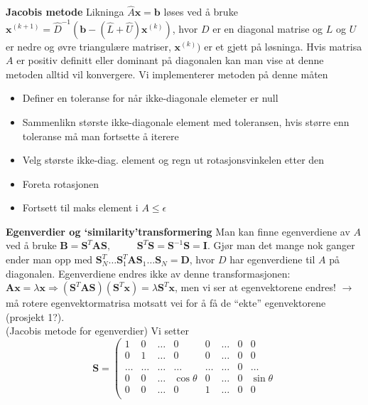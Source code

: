 \documentclass[12pt,a4paper,twocolumn]{article}
\begin{document}
\begin{flushleft}
\textbf{Jacobis metode} Likninga $\hat{A}\mathbf{x}=\mathbf{b}$ løses ved å bruke $\mathbf{x}^{(k+1)}= \hat{D}^{-1}(\mathbf{b}-(\hat{L}+\hat{U})\mathbf{x}^{(k)})$, hvor $D$ er en diagonal matrise og $L$ og $U$ er nedre og øvre triangulære matriser, $\mathbf{x}^{(k)})$ er et gjett på løsninga. Hvis matrisa $A$ er positiv definitt eller dominant på diagonalen kan man vise at denne metoden alltid vil konvergere. Vi implementerer metoden på denne måten
\begin{itemize}
  \item Definer en toleranse for når ikke-diagonale elemeter er null
  \item Sammenlikn største ikke-diagonale element med toleransen, hvis større enn toleranse må man fortsette å iterere
  \item Velg største ikke-diag. element og regn ut rotasjonsvinkelen etter den
  \item Foreta rotasjonen
  \item Fortsett til maks element i $A\leq\epsilon$
\end{itemize}
\textbf{Egenverdier og `similarity'transformering} Man kan finne egenverdiene av $A$ ved å bruke $\mathbf{B}= \mathbf{S}^T \mathbf{A}\mathbf{S},\, \hspace{1cm}  \mathbf{S}^T\mathbf{S}=\mathbf{S}^{-1}\mathbf{S} =\mathbf{I}$. Gjør man det mange nok ganger ender man opp med $\mathbf{S}_N^T\dots \mathbf{S}_1^T\mathbf{A}\mathbf{S}_1\dots \mathbf{S}_N=\mathbf{D}$, hvor $D$ har egenverdiene til $A$ på diagonalen. Egenverdiene endres ikke av denne transformasjonen: $\mathbf{A}\mathbf{x}=\lambda\mathbf{x} \Rightarrow (\mathbf{S}^T\mathbf{A}\mathbf{S})(\mathbf{S}^T\mathbf{x})=\lambda\mathbf{S}^T\mathbf{x}$, men vi ser at egenvektorene endres! $\to$ må rotere egenvektormatrisa motsatt vei for å få de ``ekte'' egenvektorene (prosjekt 1?).\\
(Jacobis metode for egenverdier) Vi setter
$$ \mathbf{S}=
 \left( 
   \begin{array}{cccccccc}
   1  &    0  & \dots &   0        &    0  & \dots & 0 &   0       \\
   0  &    1  & \dots &   0        &    0  & \dots & 0 &   0       \\
\dots & \dots & \dots & \dots      & \dots & \dots & 0 & \dots     \\ 
   0  &    0  & \dots & \cos\theta  &    0  & \dots & 0 & \sin\theta \\
   0  &    0  & \dots &   0        &    1  & \dots & 0 &   0       \\

\end{array}$$
\end{flushleft}
\end{document}

